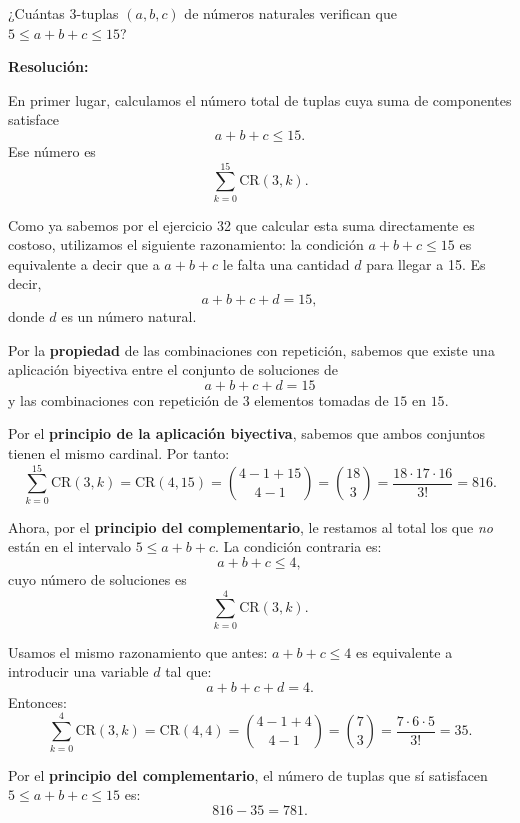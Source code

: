 \documentclass[a4paper,12pt]{article}
\begin{document}
\begin{ejercicio}[title=Ejercicio 33]
¿Cuántas 3-tuplas $(a,b,c)$ de números naturales verifican que $5 \le a+b+c \le 15$?

\tcblower
\textbf{Resolución:}

En primer lugar, calculamos el número total de tuplas cuya suma de componentes satisface
\[
a+b+c \le 15.
\]
Ese número es
\[
\sum_{k=0}^{15} \mathrm{CR}(3,k).
\]

Como ya sabemos por el ejercicio 32 que calcular esta suma directamente es costoso, utilizamos el siguiente razonamiento:  
la condición \(a+b+c \le 15\) es equivalente a decir que a \(a+b+c\) le falta una cantidad \(d\) para llegar a 15. Es decir,
\[
a+b+c+d = 15,
\]
donde \(d\) es un número natural.

Por la \textbf{propiedad} de las combinaciones con repetición, sabemos que existe una aplicación biyectiva entre el conjunto de soluciones de
\[
a+b+c+d = 15
\]
y las combinaciones con repetición de \(3\) elementos tomadas de \(15\) en \(15\).

Por el \textbf{principio de la aplicación biyectiva}, sabemos que ambos conjuntos tienen el mismo cardinal. Por tanto:
\[
\sum_{k=0}^{15} \mathrm{CR}(3,k) = \mathrm{CR}(4,15)
= \binom{4-1+15}{4-1}
= \binom{18}{3}
= \frac{18\cdot17\cdot16}{3!}
= 816.
\]

Ahora, por el \textbf{principio del complementario}, le restamos al total los que \emph{no} están en el intervalo \(5\le a+b+c\).  
La condición contraria es:
\[
a+b+c \le 4,
\]
cuyo número de soluciones es
\[
\sum_{k=0}^{4} \mathrm{CR}(3,k).
\]

Usamos el mismo razonamiento que antes: \(a+b+c \le 4\) es equivalente a introducir una variable \(d\) tal que:
\[
a+b+c+d = 4.
\]
Entonces:
\[
\sum_{k=0}^{4} \mathrm{CR}(3,k)
= \mathrm{CR}(4,4)
= \binom{4-1+4}{4-1}
= \binom{7}{3}
= \frac{7\cdot6\cdot5}{3!}
= 35.
\]

Por el \textbf{principio del complementario}, el número de tuplas que sí satisfacen \(5 \le a+b+c \le 15\) es:
\[
816 - 35 = \boxed{781}.
\]

\end{ejercicio}
\end{document}
